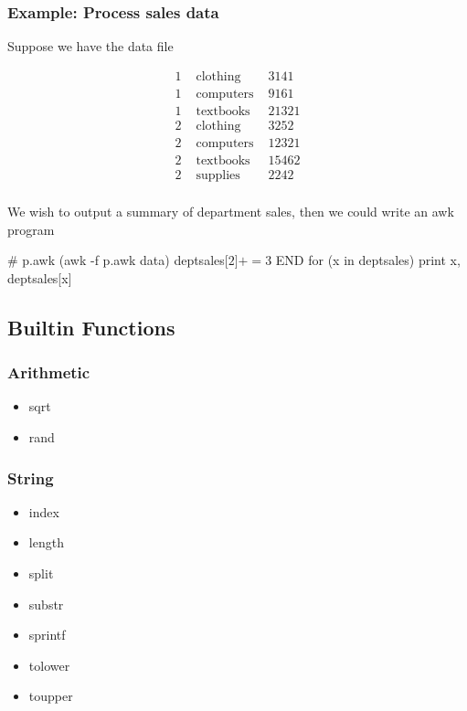 \documentclass{report}
\begin{document}
    \subsubsection{Example: Process sales data}
    \bigbreak \noindent 
    Suppose we have the data file 
    \bigbreak \noindent 
    \begin{center}
        \[
        \begin{array}{llr}
            1 & \text { clothing } & 3141 \\
            1 & \text { computers } & 9161 \\
            1 & \text { textbooks } & 21321 \\
            2 & \text { clothing } & 3252 \\
            2 & \text { computers } & 12321 \\
            2 & \text { textbooks } & 15462 \\
            2 & \text { supplies } & 2242 \\
        \end{array}
    \]
    \end{center}
    \bigbreak \noindent 
    We wish to output a summary of department sales, then we could write an awk program
    \bigbreak \noindent 
    \begin{bashcode}
        # p.awk (awk -f p.awk data)
        {
            deptsales[$2] += $3
        }
        END {
            for (x in deptsales) {
                print x, deptsales[x]
            }
        }
    \end{bashcode}

    \bigbreak \noindent 
    \subsection{Builtin Functions}
    \bigbreak \noindent 
    \subsubsection{Arithmetic}
    \begin{itemize}
        \item sqrt
        \item rand
    \end{itemize}

    \bigbreak \noindent 
    \subsubsection{String}
    \begin{itemize}
        \item index
        \item length
        \item split
        \item substr
        \item sprintf
        \item tolower
        \item toupper
    \end{itemize}
\end{document}
